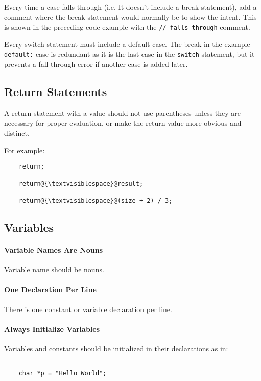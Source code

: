 \documentclass[fleqn,12pt]{PARCOneColumn} %
\begin{document}
Every time a case falls through (i.e. It doesn't include a break statement), add a comment where the break statement would normally be to show the intent.
This is shown in the preceding code example with the {\tt // falls through} comment.

Every switch statement must include a default case.
The break in the example {\tt default:} case is redundant as it is the last case in the {\tt switch} statement, but it prevents a fall-through error if another case is added later.

\subsection{Return Statements}

A return statement with a value should not use parentheses unless they are necessary for proper evaluation,
or make the return value more obvious and distinct.

For example:

\begin{lstlisting}
    return;

    return@{\textvisiblespace}@result;

    return@{\textvisiblespace}@(size + 2) / 3;
\end{lstlisting}

\subsection{Variables}

\paragraph{Variable Names Are Nouns}
Variable name should be nouns.

\paragraph{One Declaration Per Line}
There is one constant or variable declaration per line.

\paragraph{Always Initialize Variables}
Variables and constants should be initialized in their declarations as in:

\begin{lstlisting}

    char *p = "Hello World";

\end{lstlisting}
\end{document}

